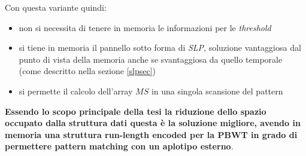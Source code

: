 Con questa variante quindi:
\begin{itemize}
  \item non si necessita di tenere in memoria le informazioni per le
  \textit{threshold}
  \item si tiene in memoria il pannello sotto forma di \textit{SLP}, soluzione
  vantaggiosa dal punto di vista della memoria anche se svantaggiosa da quello
  temporale (come descritto nella sezione \ref{slpsec})
  \item si permette il calcolo dell'array $MS$ in una singola scansione del
  pattern 
\end{itemize}
\textbf{Essendo lo scopo principale della tesi la riduzione dello spazio
  occupato dalla struttura dati questa è la soluzione migliore, avendo in
  memoria una struttura run-length encoded per la PBWT in grado di permettere
  pattern matching con un aplotipo esterno}.
